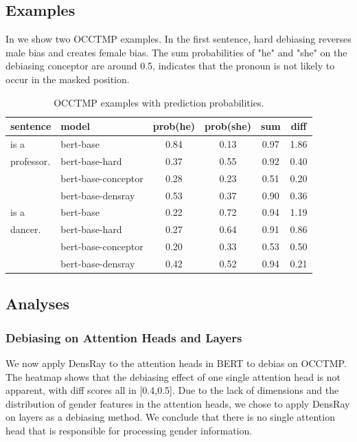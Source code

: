 \subsection{Examples}
In  we show two OCCTMP examples. In the first sentence, hard debiasing reverses male bias and creates female bias. The sum probabilities of "he" and "she" on the debiasing conceptor are around 0.5, indicates that the pronoun is not likely to occur in the masked position.
\begin{table}[h]
	\centering
	\footnotesize
	\begin{tabular}{llcccc}
		\hline
		sentence & model & prob(he) & prob(she) &sum&diff\\
		\hline
		[MASK] is a & bert-base & 0.84 & 0.13&0.97&1.86\\
		professor.& bert-base-hard& 0.37 & 0.55&0.92&0.40\\
		& bert-base-conceptor& 0.28 & 0.23&0.51&{0.20}\\
		& bert-base-densray & 0.53 & 0.37&0.90&0.36\\
		\hline
		[MASK] is a & bert-base & 0.22 & 0.72&0.94&1.19\\
		dancer.  & bert-base-hard& 0.27 & 0.64&0.91&0.86\\
		& bert-base-conceptor& 0.20 & 0.33&0.53&0.50\\
		& bert-base-densray& 0.42 & 0.52&0.94&0.21\\
		\hline
	\end{tabular}
	\caption{
		OCCTMP examples with prediction probabilities.}
\end{table}


\subsection{Analyses}

\subsubsection{Debiasing on Attention Heads and Layers}
We now apply DensRay to the attention heads in BERT to debias on OCCTMP. The heatmap  shows that the debiasing effect of one single attention head is not apparent, with diff scores all in [0.4,0.5]. Due to the lack of dimensions and the distribution of gender features in the attention heads, we chose to apply DensRay on layers as a debiasing method. We conclude that there is no single attention head that is responsible for processing gender information.

